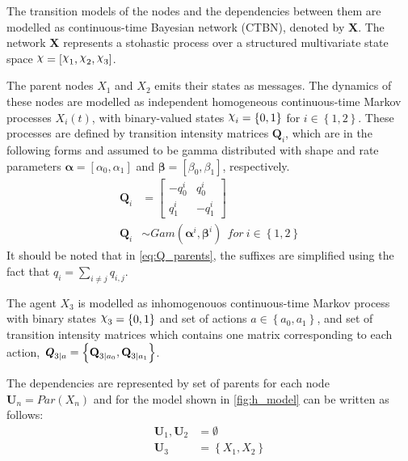 The transition models of the nodes and the dependencies between them are modelled as continuous-time Bayesian network (CTBN), denoted by \textbf{X}. The network \textbf{X} represents a stohastic process over a structured multivariate state space $ \rchi = [\rchi_1, \rchi_2, \rchi_3] $. 

The parent nodes $X_{1}$ and $ X_{2} $ emits their states as messages. The dynamics  of these nodes are modelled as independent homogeneous continuous-time Markov processes $X_{i}(t)$, with binary-valued states $ \rchi_{i} = \left\lbrace 0, 1 \right\rbrace  $ for $ i \in \left\lbrace 1,2 \right\rbrace $. These processes are defined by transition intensity matrices $ \textbf{Q}_{i} $, which are in the following forms and assumed to be gamma distributed with shape and rate parameters $ \boldsymbol{\alpha} = [\alpha_0, \alpha_1] $ and $ \boldsymbol{\beta} = [\beta_0, \beta_1] $, respectively.
\begin{align}
\textbf{Q}_i &= 
\begin{bmatrix}
-q^i_{0} & q^i_{0} \\
q^i_{1} &  -q^i_{1}
\end{bmatrix}
\label{eq:Q_parents}\\
\textbf{Q}_{i} &\sim Gam(\boldsymbol{\alpha}^i, \boldsymbol{\beta}^i)\ \ for\ i \in \left\lbrace 1,2\right\rbrace \nonumber
\end{align}
It should be noted that in \autoref{eq:Q_parents}, the suffixes are simplified using the fact that $ q_{i} = \sum_{i \neq j} q_{i,j}$.

The agent  $ X_{3} $ is modelled as inhomogenouos continuous-time Markov process with binary states $ \rchi_{3} = \left\lbrace 0, 1 \right\rbrace  $ and set of actions $ a \in \left\lbrace a_0, a_1\right\rbrace  $, and set of transition intensity matrices which contains one matrix corresponding to each action, $ \textbf{\textit{Q}}_{3 \mid a} = \left\lbrace \textbf{Q}_{3\mid a_{0}}, \textbf{Q}_{3\mid a_{1}} \right\rbrace $.

The dependencies are represented by set of parents for each node $ \textbf{U}_{n} = Par(X_n) $ and for the model shown in \autoref{fig:h_model} can be written as follows:
\begin{align*}
\textbf{U}_{1}, \textbf{U}_{2} & = \emptyset \\
\textbf{U}_{3} & = \left\lbrace X_1, X_2 \right\rbrace 
\end{align*}

